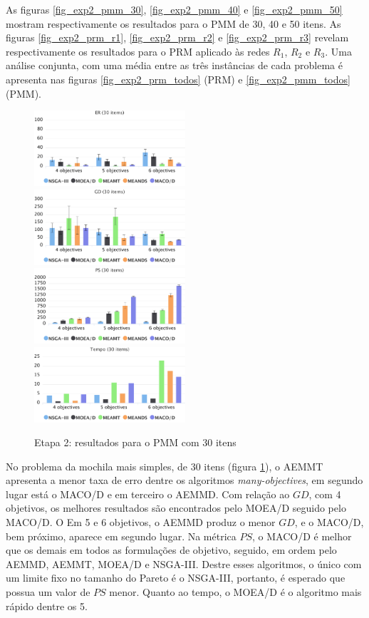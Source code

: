 As figuras \ref{fig_exp2_pmm_30}, \ref{fig_exp2_pmm_40} e \ref{fig_exp2_pmm_50} mostram respectivamente os resultados para o PMM de 30, 40 e 50 itens. As figuras \ref{fig_exp2_prm_r1}, \ref{fig_exp2_prm_r2} e \ref{fig_exp2_prm_r3} revelam respectivamente os resultados para o PRM aplicado às redes $R_1$, $R_2$ e $R_3$. Uma análise conjunta, com uma média entre as três instâncias de cada problema é apresenta nas figuras \ref{fig_exp2_prm_todos} (PRM) e \ref{fig_exp2_pmm_todos} (PMM).

\begin{figure}[!htbp]
	\caption{Etapa 2: resultados para o PMM com 30 itens}
	\label{fig_exp2_mkp_30}
	\includegraphics[width=0.5\textwidth]{cap_experimentos/figs/etapa2/er-mkp-30}
	\includegraphics[width=0.5\textwidth]{cap_experimentos/figs/etapa2/gd-mkp-30}
	\includegraphics[width=0.5\textwidth]{cap_experimentos/figs/etapa2/ps-mkp-30}
	\includegraphics[width=0.5\textwidth]{cap_experimentos/figs/etapa2/time-mkp-30}
\end{figure}

No problema da mochila mais simples, de 30 itens (figura \ref{fig_exp2_mkp_30}), o AEMMT apresenta a menor taxa de erro dentre os algoritmos \textit{many-objectives}, em segundo lugar está o MACO/D e em terceiro o AEMMD. Com relação ao $GD$, com 4 objetivos, os melhores resultados são encontrados pelo MOEA/D seguido pelo MACO/D. O Em 5 e 6 objetivos, o AEMMD produz o menor $GD$, e o MACO/D, bem próximo, aparece em segundo lugar. Na métrica $PS$, o MACO/D é melhor que os demais em todos as formulações de objetivo, seguido, em ordem pelo AEMMD, AEMMT, MOEA/D e NSGA-III. Destre esses algoritmos, o único com um limite fixo no tamanho do Pareto é o NSGA-III, portanto, é esperado que possua um valor de $PS$ menor. Quanto ao tempo, o MOEA/D é o algoritmo mais rápido dentre os 5.

